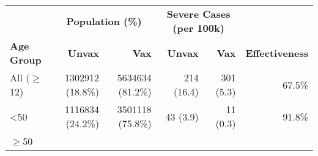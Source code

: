 \begin{table}[ht]
\centering
\begin{tabular}{lrrrrr}
  \toprule
  & \multicolumn{2}{c}{\textbf{Population (\%)}} & \multicolumn{2}{c}{\textbf{Severe Cases (per 100k)}} & \\
 \cmidrule(lr){2-3} \cmidrule(lr){4-5}
 \textbf{Age Group} & \textbf{Unvax} & \textbf{Vax} & \textbf{Unvax} & \textbf{Vax} & \textbf{Effectiveness} \\
 \midrule
All ($\geq$12) & 1302912 (18.8\%) & 5634634 (81.2\%) & 214 (16.4) & 301 (5.3) & 67.5\% \\
  <50 & 1116834 (24.2\%) & 3501118 (75.8\%) & 43 (3.9) & 11 (0.3) & 91.8\% \\
  $\geq$50 &  &  &  &  &  \\
   \bottomrule
\end{tabular}
\end{table}
